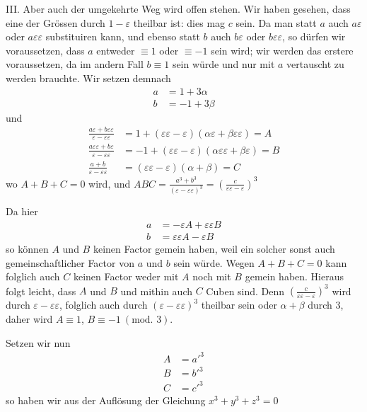 III. Aber auch der umgekehrte Weg wird offen stehen. Wir haben gesehen, dass eine der Grössen durch $1-\varepsilon$ theilbar ist: dies mag $c$ sein. Da man statt $a$ auch $a\varepsilon$ oder $a\varepsilon\varepsilon$ substituiren kann, und ebenso statt $b$ auch $b\varepsilon$ oder $b\varepsilon\varepsilon$, so dürfen wir voraussetzen, dass $a$ entweder $\equiv1$ oder $\equiv-1$ sein wird; wir werden das erstere voraussetzen, da im andern Fall $b\equiv1$ sein würde und nur mit $a$ vertauscht zu werden brauchte. Wir setzen demnach
\[
\begin{aligned}
a&=1+3\alpha\\
b&=-1+3\beta
\end{aligned}
\]
und
\[
\begin{aligned}
\frac{a\varepsilon+b\varepsilon\varepsilon}{\varepsilon-\varepsilon\varepsilon}&=1+(\varepsilon\varepsilon-\varepsilon)(\alpha\varepsilon+\beta\varepsilon\varepsilon)=A\\
\frac{a\varepsilon\varepsilon+b\varepsilon}{\varepsilon-\varepsilon\varepsilon}&=-1+(\varepsilon\varepsilon-\varepsilon)(\alpha\varepsilon\varepsilon+\beta\varepsilon)=B\\
\frac{a+b}{\varepsilon-\varepsilon\varepsilon}&=(\varepsilon\varepsilon-\varepsilon)(\alpha+\beta)=C
\end{aligned}
\]
wo $A+B+C=0$ wird, und $ABC=\frac{a^3+b^3}{(\varepsilon-\varepsilon\varepsilon)^3}=\left(\frac c{\varepsilon\varepsilon-\varepsilon}\right)^3$

Da hier
\[
\begin{aligned}
a&=-\varepsilon A+\varepsilon\varepsilon B\\
b&=\varepsilon\varepsilon A-\varepsilon B
\end{aligned}
\]
so können $A$ und $B$ keinen Factor gemein haben, weil ein solcher sonst auch gemeinschaftlicher Factor von $a$ und $b$ sein würde. Wegen $A+B+C=0$ kann folglich auch $C$ keinen Factor weder mit $A$ noch mit $B$ gemein haben. Hieraus folgt leicht, dass $A$ und $B$ und mithin auch $C$ Cuben sind. Denn $\left(\frac c{\varepsilon\varepsilon-\varepsilon}\right)^3$ wird durch $\varepsilon-\varepsilon\varepsilon$, folglich auch durch $(\varepsilon-\varepsilon\varepsilon)^3$ theilbar sein oder $\alpha+\beta$ durch $3$, daher wird $A\equiv1$, $B\equiv-1\ (\text{mod. }3)$.

Setzen wir nun
\[
\begin{aligned}
A&=a'^3\\
B&=b'^3\\
C&=c'^3
\end{aligned}
\]
so haben wir aus der Auflösung der Gleichung $x^3+y^3+z^3=0$

